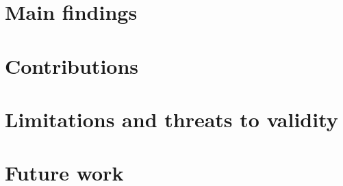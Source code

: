 
\section{Main findings}

\section{Contributions}

\section{Limitations and threats to validity}

\section{Future work}
